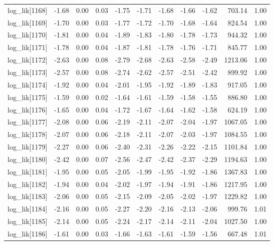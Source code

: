 \begin{table}[ht]
\begin{tabular}{rrrrrrrrrrr}
  log\_lik[1168] & -1.68 & 0.00 & 0.03 & -1.75 & -1.71 & -1.68 & -1.66 & -1.62 & 703.14 & 1.00 \\ 
  log\_lik[1169] & -1.70 & 0.00 & 0.03 & -1.77 & -1.72 & -1.70 & -1.68 & -1.64 & 824.54 & 1.00 \\ 
  log\_lik[1170] & -1.81 & 0.00 & 0.04 & -1.89 & -1.83 & -1.80 & -1.78 & -1.73 & 944.32 & 1.00 \\ 
  log\_lik[1171] & -1.78 & 0.00 & 0.04 & -1.87 & -1.81 & -1.78 & -1.76 & -1.71 & 845.77 & 1.00 \\ 
  log\_lik[1172] & -2.63 & 0.00 & 0.08 & -2.79 & -2.68 & -2.63 & -2.58 & -2.49 & 1213.06 & 1.00 \\ 
  log\_lik[1173] & -2.57 & 0.00 & 0.08 & -2.74 & -2.62 & -2.57 & -2.51 & -2.42 & 899.92 & 1.00 \\ 
  log\_lik[1174] & -1.92 & 0.00 & 0.04 & -2.01 & -1.95 & -1.92 & -1.89 & -1.83 & 917.05 & 1.00 \\ 
  log\_lik[1175] & -1.59 & 0.00 & 0.02 & -1.64 & -1.61 & -1.59 & -1.58 & -1.55 & 886.80 & 1.00 \\ 
  log\_lik[1176] & -1.65 & 0.00 & 0.04 & -1.72 & -1.67 & -1.64 & -1.62 & -1.58 & 624.19 & 1.00 \\ 
  log\_lik[1177] & -2.08 & 0.00 & 0.06 & -2.19 & -2.11 & -2.07 & -2.04 & -1.97 & 1067.05 & 1.00 \\ 
  log\_lik[1178] & -2.07 & 0.00 & 0.06 & -2.18 & -2.11 & -2.07 & -2.03 & -1.97 & 1084.55 & 1.00 \\ 
  log\_lik[1179] & -2.27 & 0.00 & 0.06 & -2.40 & -2.31 & -2.26 & -2.22 & -2.15 & 1101.84 & 1.00 \\ 
  log\_lik[1180] & -2.42 & 0.00 & 0.07 & -2.56 & -2.47 & -2.42 & -2.37 & -2.29 & 1194.63 & 1.00 \\ 
  log\_lik[1181] & -1.95 & 0.00 & 0.05 & -2.05 & -1.99 & -1.95 & -1.92 & -1.86 & 1367.83 & 1.00 \\ 
  log\_lik[1182] & -1.94 & 0.00 & 0.04 & -2.02 & -1.97 & -1.94 & -1.91 & -1.86 & 1217.95 & 1.00 \\ 
  log\_lik[1183] & -2.06 & 0.00 & 0.05 & -2.15 & -2.09 & -2.05 & -2.02 & -1.97 & 1229.82 & 1.00 \\ 
  log\_lik[1184] & -2.16 & 0.00 & 0.05 & -2.27 & -2.20 & -2.16 & -2.13 & -2.06 & 999.76 & 1.01 \\ 
  log\_lik[1185] & -2.14 & 0.00 & 0.05 & -2.24 & -2.17 & -2.14 & -2.11 & -2.04 & 1027.50 & 1.00 \\ 
  log\_lik[1186] & -1.61 & 0.00 & 0.03 & -1.66 & -1.63 & -1.61 & -1.59 & -1.56 & 667.48 & 1.01 \\ 

\end{tabular}
\end{table}
